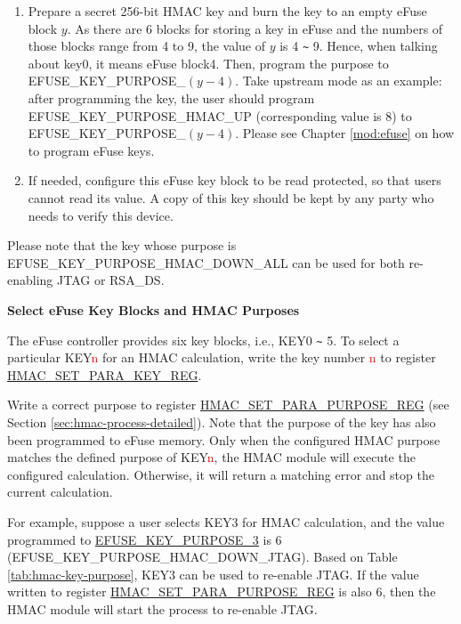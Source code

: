 \documentclass[main\_\_EN.tex]{subfiles}
\begin{document}
\begin{enumerate}
    \item Prepare a secret 256-bit HMAC key and burn the key to an empty eFuse block $y$. As there are 6 blocks for storing a key in eFuse and the numbers of those blocks range from 4 to 9, the value of $y$ is 4 \verb+~+ 9. Hence, when talking about key0, it means eFuse block4. Then, program the purpose to EFUSE\_KEY\_PURPOSE\_$(y-4)$. Take upstream mode as an example: after programming the key, the user should program EFUSE\_KEY\_PURPOSE\_HMAC\_UP (corresponding value is 8) to EFUSE\_KEY\_PURPOSE\_$(y-4)$. Please see Chapter \ref{mod:efuse} \textit{} on how to program eFuse keys.
    \item If needed, configure this eFuse key block to be read protected, so that users cannot read its value. A copy of this key should be kept by any party who needs to verify this device.
\end{enumerate}

Please note that the key whose purpose is EFUSE\_KEY\_PURPOSE\_HMAC\_DOWN\_ALL can be used for both re-enabling JTAG or RSA\_DS.



\textbf{Select eFuse Key Blocks and HMAC Purposes}
\label{sec:hmac-config-purposes}

The eFuse controller provides six key blocks, i.e., KEY0 \verb+~+ 5. To select a particular KEY\textcolor{red}{n} for an HMAC calculation, write the key number \textcolor{red}{n} to register \hyperref[regdesc:HMACSETPARAKEYREG]{HMAC\_SET\_PARA\_KEY\_REG}.

Write a correct purpose to register \hyperref[regdesc:HMACSETPARAPURPOSEREG]{HMAC\_SET\_PARA\_PURPOSE\_REG} (see Section \ref{sec:hmac-process-detailed}). Note that the purpose of the key has also been programmed to eFuse memory. Only when the configured HMAC purpose matches the defined purpose of KEY\textcolor{red}{n}, the HMAC module will execute the configured calculation. Otherwise, it will return a matching error and stop the current calculation.

For example, suppose a user selects KEY3 for HMAC calculation, and the value programmed to \hyperref[fielddesc:EFUSEKEYPURPOSE3]{EFUSE\_KEY\_PURPOSE\_3} is 6 (EFUSE\_KEY\_PURPOSE\_HMAC\_DOWN\_JTAG). Based on Table \ref{tab:hmac-key-purpose}, KEY3 can be used to re-enable JTAG. If the value written to register \hyperref[regdesc:HMACSETPARAPURPOSEREG]{HMAC\_SET\_PARA\_PURPOSE\_REG} is also 6, then the HMAC module will start the process to re-enable JTAG.
\end{document}
